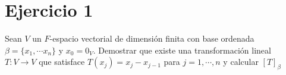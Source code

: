 \section*{Ejercicio 1}

Sean $V$ un $F$-espacio vectorial de dimensión finita con base ordenada
$\beta = \{ x_{1}, \cdots x_{n} \}$ y $x_{0} = 0_{V}$. Demostrar que existe 
una transformación lineal $T: V \rightarrow V$ que satisface $T(x_{j}) = x_{j} - x_{j-1}$
para $j = 1, \cdots , n$ y calcular $\left[ T \right]_{\beta}$

